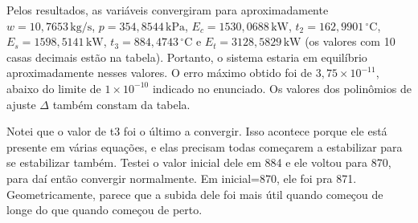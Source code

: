 \documentclass[11pt]{article}
\begin{document}
Pelos resultados, as variáveis convergiram para aproximadamente $w = 10{,}7653\,\mathrm{kg/s}$, $p = 354{,}8544\,\mathrm{kPa}$, $E_c = 1530{,}0688\,\mathrm{kW}$, $t_2 = 162{,}9901\,^{\circ}\mathrm{C}$, $E_s = 1598{,}5141\,\mathrm{kW}$, $t_3 = 884{,}4743\,^{\circ}\mathrm{C}$ e $E_t = 3128{,}5829\,\mathrm{kW}$ (os valores com 10 casas decimais estão na tabela). Portanto, o sistema estaria em equilíbrio aproximadamente nesses valores. O erro máximo obtido foi de $3{,}75 \times 10^{-11}$, abaixo do limite de $1 \times 10^{-10}$ indicado no enunciado. Os valores dos polinômios de ajuste $\Delta$ também constam da tabela.

Notei que o valor de t3 foi o último a convergir. Isso acontece porque ele está presente em várias equações, e elas precisam todas começarem a estabilizar para se estabilizar também. Testei o valor inicial dele em 884 e ele voltou para 870, para daí então convergir normalmente. Em inicial=870, ele foi pra 871. Geometricamente, parece que a subida dele foi mais útil quando começou de longe do que quando começou de perto.
 
\end{document}
